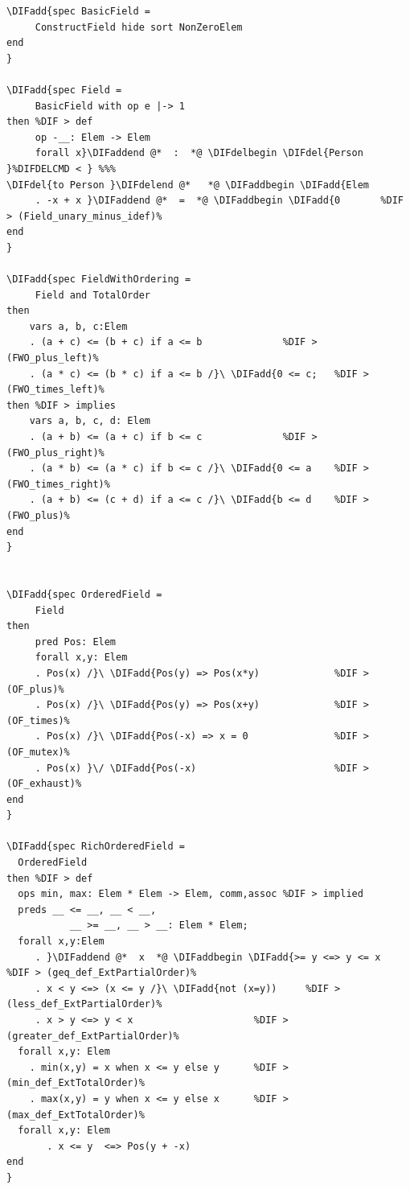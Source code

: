\documentclass[10pt,fleqn,final]{scrreprt}
\providecommand{\DIFadd}[1]{{\protect\color{blue}\uwave{#1}}} %
\providecommand{\DIFdel}[1]{{\protect\color{red}\sout{#1}}}                      %
\providecommand{\DIFaddbegin}{} %
\providecommand{\DIFaddend}{} %
\providecommand{\DIFdelbegin}{} %
\providecommand{\DIFdelend}{} %
\begin{document}
\begin{lstlisting}[basicstyle=\ttfamily,language=dolText,alsolanguage=CASL,escapechar=@,mathescape]
\DIFadd{spec BasicField =
     ConstructField hide sort NonZeroElem
end
}

\DIFadd{spec Field =
     BasicField with op e |-> 1
then %DIF > def
     op -__: Elem -> Elem
     forall x}\DIFaddend @*  :  *@ \DIFdelbegin \DIFdel{Person }%DIFDELCMD < } %%%
\DIFdel{to Person }\DIFdelend @*   *@ \DIFaddbegin \DIFadd{Elem
     . -x + x }\DIFaddend @*  =  *@ \DIFaddbegin \DIFadd{0       %DIF > (Field_unary_minus_idef)%
end
}

\DIFadd{spec FieldWithOrdering =
     Field and TotalOrder
then
    vars a, b, c:Elem
    . (a + c) <= (b + c) if a <= b              %DIF > (FWO_plus_left)%
    . (a * c) <= (b * c) if a <= b /}\ \DIFadd{0 <= c;   %DIF > (FWO_times_left)%
then %DIF > implies
    vars a, b, c, d: Elem
    . (a + b) <= (a + c) if b <= c              %DIF > (FWO_plus_right)%
    . (a * b) <= (a * c) if b <= c /}\ \DIFadd{0 <= a    %DIF > (FWO_times_right)%
    . (a + b) <= (c + d) if a <= c /}\ \DIFadd{b <= d    %DIF > (FWO_plus)%
end
}


\DIFadd{spec OrderedField =
     Field
then
     pred Pos: Elem
     forall x,y: Elem
     . Pos(x) /}\ \DIFadd{Pos(y) => Pos(x*y)             %DIF > (OF_plus)%
     . Pos(x) /}\ \DIFadd{Pos(y) => Pos(x+y)             %DIF > (OF_times)%
     . Pos(x) /}\ \DIFadd{Pos(-x) => x = 0               %DIF > (OF_mutex)%
     . Pos(x) }\/ \DIFadd{Pos(-x)                        %DIF > (OF_exhaust)%
end
}

\DIFadd{spec RichOrderedField =
  OrderedField 
then %DIF > def
  ops min, max: Elem * Elem -> Elem, comm,assoc %DIF > implied
  preds __ <= __, __ < __,
           __ >= __, __ > __: Elem * Elem;
  forall x,y:Elem
     . }\DIFaddend @*  x  *@ \DIFaddbegin \DIFadd{>= y <=> y <= x                   %DIF > (geq_def_ExtPartialOrder)%
     . x < y <=> (x <= y /}\ \DIFadd{not (x=y))     %DIF > (less_def_ExtPartialOrder)%
     . x > y <=> y < x                     %DIF > (greater_def_ExtPartialOrder)%
  forall x,y: Elem
    . min(x,y) = x when x <= y else y      %DIF > (min_def_ExtTotalOrder)%
    . max(x,y) = y when x <= y else x      %DIF > (max_def_ExtTotalOrder)%
  forall x,y: Elem
       . x <= y  <=> Pos(y + -x)
end
}


\end{lstlisting}
\end{document}
